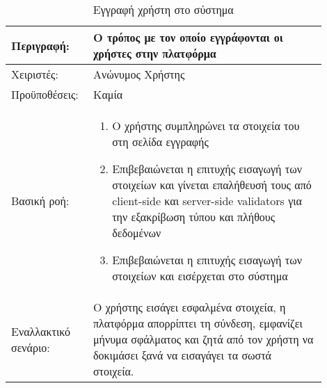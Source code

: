 \begin{table}[h]
	\caption{Εγγραφή χρήστη στο σύστημα}
	\label{tab:use-case-register}
	\begin{tabular}{|p{0.2\linewidth}|p{0.7\linewidth}|}
		\hline
		Περιγραφή: & Ο τρόπος με τον οποίο εγγράφονται οι χρήστες στην πλατφόρμα \\ \hline
		Χειριστές: & Ανώνυμος Χρήστης \\ \hline
		Προϋποθέσεις: & Καμία \\ \hline
		Βασική ροή: & 
		\vspace{-0.5cm}
		\begin{enumerate}
			\item Ο χρήστης συμπληρώνει τα στοιχεία του στη σελίδα εγγραφής
			\item Επιβεβαιώνεται η επιτυχής εισαγωγή των στοιχείων και γίνεται επαλήθευσή τους από client-side και server-side validators για την εξακρίβωση τύπου και πλήθους δεδομένων
			\item Επιβεβαιώνεται η επιτυχής εισαγωγή των στοιχείων και εισέρχεται στο σύστημα
		\end{enumerate}\vspace{-0.7cm} \\ \hline
		Εναλλακτικό σενάριο: & O χρήστης εισάγει εσφαλμένα στοιχεία, η πλατφόρμα απορρίπτει τη σύνδεση, εμφανίζει μήνυμα σφάλματος και ζητά από τον χρήστη να δοκιμάσει ξανά να εισαγάγει τα σωστά στοιχεία.                     \\ \hline
	\end{tabular}
\end{table}

